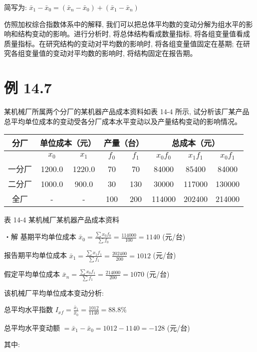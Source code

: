 \documentclass[10pt]{article}
\begin{document}
\begin{CJK*}{UTF8}{bsmi}
简写为: $\bar{x}_{1}-\bar{x}_{0}=\left(\bar{x}_{n}-\bar{x}_{0}\right)+\left(\bar{x}_{1}-\bar{x}_{n}\right)$

仿照加权综合指数体系中的解释, 我们可以把总体平均数的变动分解为组水平的影响和结构变动的影响。进行分析时, 将总体结构看成数量指标, 将各组变量值看成质量指标。在研究结构的变动对平均数的影响时, 将各组变量值固定在基期; 在研究各组变量值的变动对平均数的影响时, 将结构固定在报告期。

\section*{例 14.7}
某机械厂所属两个分厂的某机器产品成本资料如表 14-4 所示, 试分析该厂某产品总平均单位成本的变动受各分厂成本水平变动以及产量结构变动的影响情况。

\begin{center}
\begin{tabular}{|c|c|c|c|c|c|c|c|}
\hline
\multirow{2}{*}{分厂} & \multicolumn{2}{|c|}{单位成本（元）} & \multicolumn{2}{|c|}{产量（台）} & \multicolumn{3}{|c|}{总成本（元）} \\
\hline
 & $x_{0}$ & $x_{1}$ & $f_{0}$ & $f_{1}$ & $x_{0} f_{0}$ & $x_{1} f_{1}$ & $x_{0} f_{1}$ \\
\hline
一分厂 & 1200.0 & 1220.0 & 70 & 70 & 84000 & 85400 & 84000 \\
\hline
二分厂 & 1000.0 & 900.0 & 30 & 130 & 30000 & 117000 & 130000 \\
\hline
全厂 & - & - & 100 & 200 & 114000 & 202400 & 214000 \\
\hline
\end{tabular}
\end{center}

表 14-4 某机械厂某机器产品成本资料

・解 基期平均单位成本 $\bar{x}_{0}=\frac{\sum x_{0} f_{0}}{\sum f_{0}}=\frac{114000}{100}=1140$ (元/台)

报告期平均单位成本 $\bar{x}_{1}=\frac{\sum x_{1} f_{1}}{\sum f_{1}}=\frac{202400}{200}=1012$ (元/台)

假定平均单位成本 $\bar{x}_{n}=\frac{\sum x_{0} f_{1}}{\sum f_{1}}=\frac{214000}{200}=1070$ (元/台)

该机械厂平均单位成本变动分析:

总平均水平指数 $I_{x f}=\frac{\bar{x}_{1}}{\bar{x}_{0}}=\frac{1012}{1140}=88.8 \%$

总平均水平变动额 $=\bar{x}_{1}-\bar{x}_{0}=1012-1140=-128$ (元/台)

其中:


\end{CJK*}
\end{document}
